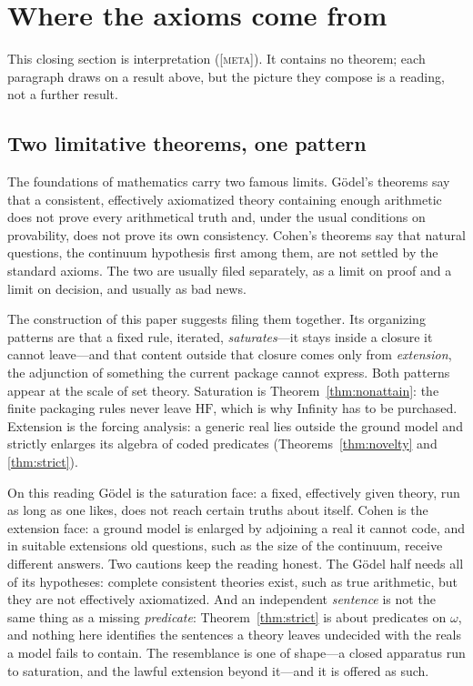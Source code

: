 \documentclass[11pt]{article}
\newcommand{\HF}{\mathrm{HF}}                 \newcommand{\rank}{\operatorname{rank}}
\newcommand{\gradetag}[1]{\textnormal{\textsc{[#1]}}}
\newcommand{\metag}{\gradetag{meta}}
\theoremstyle{definition}
\begin{document}
 \section{Where the axioms come from}\label{sec:discussion}

This closing section is interpretation (\metag). It contains no theorem; each paragraph draws on a
result above, but the picture they compose is a reading, not a further result.

\subsection{Two limitative theorems, one pattern}

The foundations of mathematics carry two famous limits. G\"odel's theorems \citep{Godel1931} say
that a consistent, effectively axiomatized theory containing enough arithmetic does not prove
every arithmetical truth and, under the usual conditions on provability, does not prove its own
consistency. Cohen's theorems \citep{Cohen1963} say that natural questions, the continuum
hypothesis first among them, are not settled by the standard axioms. The two are usually filed
separately, as a limit on proof and a limit on decision, and usually as bad news.

The construction of this paper suggests filing them together. Its organizing patterns are that a
fixed rule, iterated, \emph{saturates}---it stays inside a closure it cannot leave---and that
content outside that closure comes only from \emph{extension}, the adjunction of something the
current package cannot express. Both patterns appear at the scale of
set theory. Saturation is Theorem~\ref{thm:nonattain}: the finite packaging rules never leave
$\HF$, which is why Infinity has to be purchased. Extension is the forcing analysis: a generic real
lies outside the ground model and strictly enlarges its algebra of coded predicates
(Theorems~\ref{thm:novelty} and \ref{thm:strict}).

On this reading G\"odel is the saturation face: a fixed, effectively given theory, run as long as
one likes, does not reach certain truths about itself. Cohen is the extension face: a ground model
is enlarged by adjoining a real it cannot code, and in suitable extensions old questions, such as
the size of the continuum, receive different answers. Two cautions keep the reading honest. The
G\"odel half needs all of its hypotheses: complete consistent theories exist, such as true
arithmetic, but they are not effectively axiomatized. And an independent \emph{sentence} is not the
same thing as a missing \emph{predicate}: Theorem~\ref{thm:strict} is about predicates on $\omega$,
and nothing here identifies the sentences a theory leaves undecided with the reals a model fails to
contain. The resemblance is one of shape---a closed apparatus run to saturation, and the lawful
extension beyond it---and it is offered as such.
\end{document}
